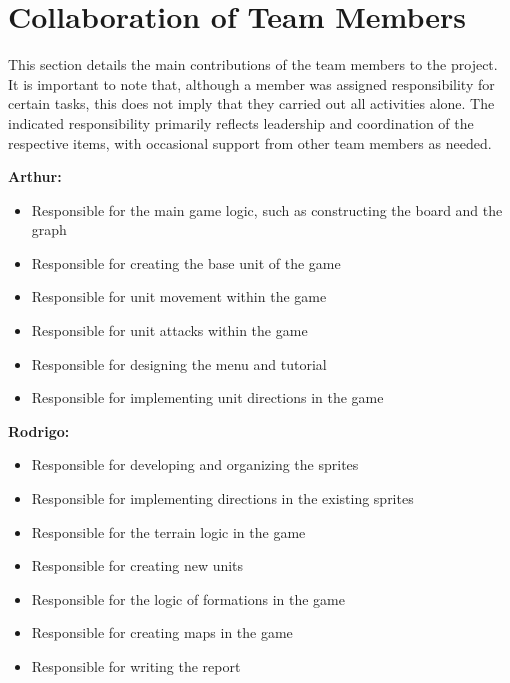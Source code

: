 \section{Collaboration of Team Members}

This section details the main contributions of the team members to the project. It is important to note that, although a member was assigned responsibility for certain tasks, this does not imply that they carried out all activities alone. The indicated responsibility primarily reflects leadership and coordination of the respective items, with occasional support from other team members as needed.

\noindent \textbf{Arthur:}
\begin{itemize}
    \item Responsible for the main game logic, such as constructing the board and the graph
    \item Responsible for creating the base unit of the game
    \item Responsible for unit movement within the game
    \item Responsible for unit attacks within the game
    \item Responsible for designing the menu and tutorial
    \item Responsible for implementing unit directions in the game
\end{itemize}

\noindent \textbf{Rodrigo:}
\begin{itemize}
    \item Responsible for developing and organizing the sprites
    \item Responsible for implementing directions in the existing sprites
    \item Responsible for the terrain logic in the game
    \item Responsible for creating new units
    \item Responsible for the logic of formations in the game
    \item Responsible for creating maps in the game
    \item Responsible for writing the report
\end{itemize}
